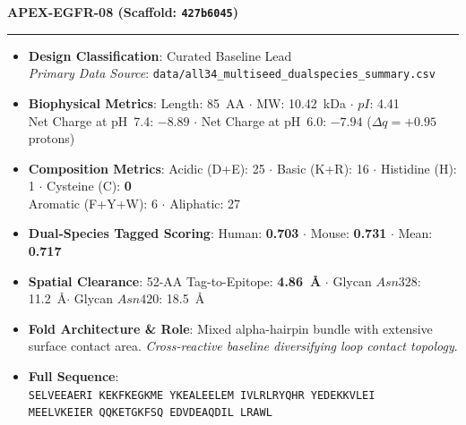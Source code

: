 \documentclass[11pt]{article}
\begin{document}
\noindent\textbf{\color{navyblue}\large APEX-EGFR-08  \quad (Scaffold: \texttt{427b6045})} \\
\vspace{-0.4em}
\rule{\textwidth}{0.6pt}
\vspace{-0.2em}
\begin{itemize}
  \setlength{\itemsep}{2pt}
  \setlength{\parskip}{0pt}
  \item \textbf{Design Classification}: Curated Baseline Lead \\
    \textit{Primary Data Source}: \texttt{\small data/all34\_multiseed\_dualspecies\_summary.csv}
  \item \textbf{Biophysical Metrics}: Length: 85~AA $\cdot$ MW: 10.42~kDa $\cdot$ $pI$: 4.41 \\
    Net Charge at pH~7.4: $-8.89$ $\cdot$ Net Charge at pH~6.0: $-7.94$ ($\Delta q = +0.95$ protons)
  \item \textbf{Composition Metrics}: Acidic (D+E): 25 $\cdot$ Basic (K+R): 16 $\cdot$ Histidine (H): 1 $\cdot$ Cysteine (C): \textbf{0} \\
    Aromatic (F+Y+W): 6 $\cdot$ Aliphatic: 27
  \item \textbf{Dual-Species Tagged Scoring}: Human: \textbf{0.703} $\cdot$ Mouse: \textbf{0.731} $\cdot$ Mean: \textbf{0.717}
  \item \textbf{Spatial Clearance}: 52-AA Tag-to-Epitope: \textbf{4.86~\AA} $\cdot$ Glycan $Asn328$: 11.2~\AA $\cdot$ Glycan $Asn420$: 18.5~\AA
  \item \textbf{Fold Architecture \& Role}: Mixed alpha-hairpin bundle with extensive surface contact area. \textit{Cross-reactive baseline diversifying loop contact topology}.
  \item \textbf{Full Sequence}: \\
    \texttt{\small SELVEEAERI KEKFKEGKME YKEALEELEM IVLRLRYQHR YEDEKKVLEI \\
    MEELVKEIER QQKETGKFSQ EDVDEAQDIL LRAWL}
\end{itemize}
\vspace{0.8em}
\end{document}
